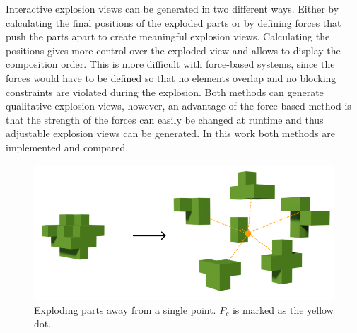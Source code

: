 Interactive explosion views can be generated in two different ways. 
Either by calculating the final positions of the exploded parts or by defining forces that push the parts apart to create meaningful explosion views.
Calculating the positions gives more control over the exploded view and allows to display the composition order. 
This is more difficult with force-based systems, since the forces would have to be defined so that no elements overlap and no blocking constraints are violated during the explosion. 
Both methods can generate qualitative explosion views, however, an advantage of the force-based method is that the strength of the forces can easily be changed at runtime and thus adjustable explosion views can be generated. 
In this work both methods are implemented and compared.



\begin{figure}[h]
	\centering
	\includegraphics[width=.65\linewidth]{fig/Images/PointExplosion}
	\caption[]{Exploding parts away from a single point. $P_c$ is marked as the yellow dot.}
	\label{fig:pointExpl1}
\end{figure}

